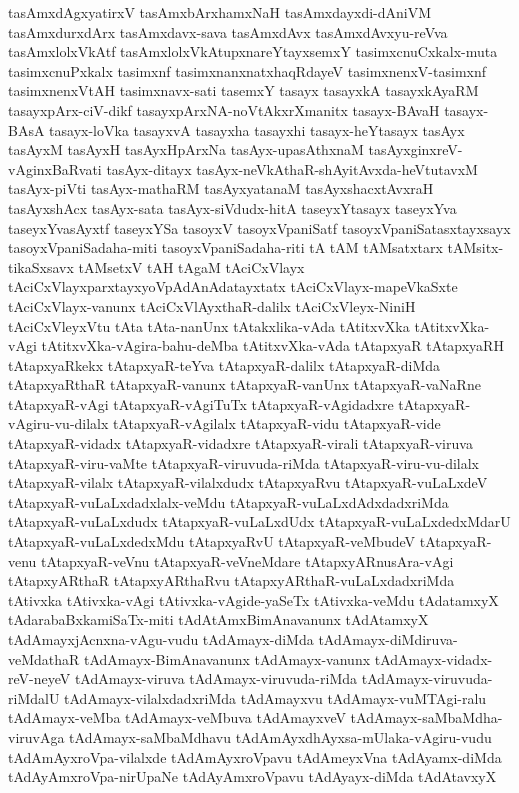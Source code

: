{tasAmxdAgxyatirxV
tasAmxbArxhamxNaH
tasAmxdayxdi-dAniVM
tasAmxdurxdArx
tasAmxdavx-sava
tasAmxdAvx
tasAmxdAvxyu-reVva
tasAmxlolxVkAtf
tasAmxlolxVkAtupxnareYtayxsemxY
tasimxcnuCxkalx-muta
tasimxcnuPxkalx
tasimxnf
tasimxnanxnatxhaqRdayeV
tasimxnenxV-tasimxnf
tasimxnenxVtAH
tasimxnavx-sati
tasemxY
tasayx
tasayxkA
tasayxkAyaRM
tasayxpArx-ciV-dikf
tasayxpArxNA-noVtAkxrXmanitx
tasayx-BAvaH
tasayx-BAsA
tasayx-loVka
tasayxvA
tasayxha
tasayxhi
tasayx-heYtasayx
tasAyx
tasAyxM
tasAyxH
tasAyxHpArxNa
tasAyx-upasAthxnaM
tasAyxginxreV-vAginxBaRvati
tasAyx-ditayx
tasAyx-neVkAthaR-shAyitAvxda-heVtutavxM
tasAyx-piVti
tasAyx-mathaRM
tasAyxyatanaM
tasAyxshacxtAvxraH
tasAyxshAcx
tasAyx-sata
tasAyx-siVdudx-hitA
taseyxYtasayx
taseyxYva
taseyxYvasAyxtf
taseyxYSa
tasoyxV
tasoyxVpaniSatf
tasoyxVpaniSatasxtayxsayx
tasoyxVpaniSadaha-miti
tasoyxVpaniSadaha-riti
tA
tAM
tAMsatxtarx
tAMsitx-tikaSxsavx
tAMsetxV
tAH
tAgaM
tAciCxVlayx
tAciCxVlayxparxtayxyoVpAdAnAdatayxtatx
tAciCxVlayx-mapeVkaSxte
tAciCxVlayx-vanunx
tAciCxVlAyxthaR-dalilx
tAciCxVleyx-NiniH
tAciCxVleyxVtu
tAta
tAta-nanUnx
tAtakxlika-vAda
tAtitxvXka
tAtitxvXka-vAgi
tAtitxvXka-vAgira-bahu-deMba
tAtitxvXka-vAda
tAtapxyaR
tAtapxyaRH
tAtapxyaRkekx
tAtapxyaR-teYva
tAtapxyaR-dalilx
tAtapxyaR-diMda
tAtapxyaRthaR
tAtapxyaR-vanunx
tAtapxyaR-vanUnx
tAtapxyaR-vaNaRne
tAtapxyaR-vAgi
tAtapxyaR-vAgiTuTx
tAtapxyaR-vAgidadxre
tAtapxyaR-vAgiru-vu-dilalx
tAtapxyaR-vAgilalx
tAtapxyaR-vidu
tAtapxyaR-vide
tAtapxyaR-vidadx
tAtapxyaR-vidadxre
tAtapxyaR-virali
tAtapxyaR-viruva
tAtapxyaR-viru-vaMte
tAtapxyaR-viruvuda-riMda
tAtapxyaR-viru-vu-dilalx
tAtapxyaR-vilalx
tAtapxyaR-vilalxdudx
tAtapxyaRvu
tAtapxyaR-vuLaLxdeV
tAtapxyaR-vuLaLxdadxlalx-veMdu
tAtapxyaR-vuLaLxdAdxdadxriMda
tAtapxyaR-vuLaLxdudx
tAtapxyaR-vuLaLxdUdx
tAtapxyaR-vuLaLxdedxMdarU
tAtapxyaR-vuLaLxdedxMdu
tAtapxyaRvU
tAtapxyaR-veMbudeV
tAtapxyaR-venu
tAtapxyaR-veVnu
tAtapxyaR-veVneMdare
tAtapxyARnusAra-vAgi
tAtapxyARthaR
tAtapxyARthaRvu
tAtapxyARthaR-vuLaLxdadxriMda
tAtivxka
tAtivxka-vAgi
tAtivxka-vAgide-yaSeTx
tAtivxka-veMdu
tAdatamxyX
tAdarabaBxkamiSaTx-miti
tAdAtAmxBimAnavanunx
tAdAtamxyX
tAdAmayxjAcnxna-vAgu-vudu
tAdAmayx-diMda
tAdAmayx-diMdiruva-veMdathaR
tAdAmayx-BimAnavanunx
tAdAmayx-vanunx
tAdAmayx-vidadx-reV-neyeV
tAdAmayx-viruva
tAdAmayx-viruvuda-riMda
tAdAmayx-viruvuda-riMdalU
tAdAmayx-vilalxdadxriMda
tAdAmayxvu
tAdAmayx-vuMTAgi-ralu
tAdAmayx-veMba
tAdAmayx-veMbuva
tAdAmayxveV
tAdAmayx-saMbaMdha-viruvAga
tAdAmayx-saMbaMdhavu
tAdAmAyxdhAyxsa-mUlaka-vAgiru-vudu
tAdAmAyxroVpa-vilalxde
tAdAmAyxroVpavu
tAdAmeyxVna
tAdAyamx-diMda
tAdAyAmxroVpa-nirUpaNe
tAdAyAmxroVpavu
tAdAyayx-diMda
tAdAtavxyX
}
